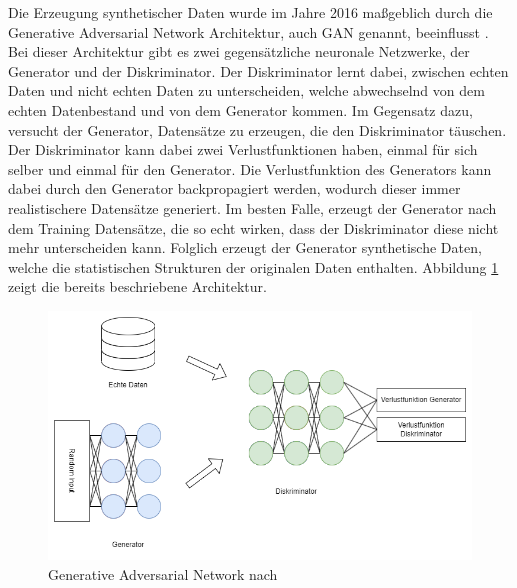 Die Erzeugung synthetischer Daten wurde im Jahre 2016 maßgeblich durch die Generative Adversarial Network Architektur, auch GAN genannt, beeinflusst \cite{P-86}. 
Bei dieser Architektur gibt es zwei gegensätzliche neuronale Netzwerke, der Generator und der Diskriminator. 
Der Diskriminator lernt dabei, zwischen echten Daten und nicht echten Daten zu unterscheiden, welche abwechselnd von dem echten Datenbestand und von dem Generator kommen.
Im Gegensatz dazu, versucht der Generator, Datensätze zu erzeugen, die den Diskriminator täuschen. 
Der Diskriminator kann dabei zwei Verlustfunktionen haben, einmal für sich selber und einmal für den Generator.
Die Verlustfunktion des Generators kann dabei durch den Generator backpropagiert werden, wodurch dieser immer realistischere Datensätze generiert.
Im besten Falle, erzeugt der Generator nach dem Training Datensätze, die so echt wirken, dass der Diskriminator diese nicht mehr unterscheiden kann.
Folglich erzeugt der Generator synthetische Daten, welche die statistischen Strukturen der originalen Daten enthalten.
Abbildung \ref{fig:gan} zeigt die bereits beschriebene Architektur.

\begin{figure}[!htb]
    \centering
    \includegraphics[width=14cm]{figures/gan}
    \caption{Generative Adversarial Network nach \cite{P-86}}
    \label{fig:gan}
\end{figure} 

